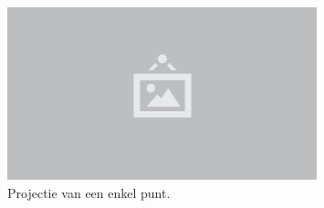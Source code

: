 \begin{figure}
  \centering
  \includegraphics[width=0.8\textwidth]{./img/raw/placeholder.png}
  \caption{Projectie van een enkel punt.}
  \label{fig:vp-projectie-punt}
\end{figure}
